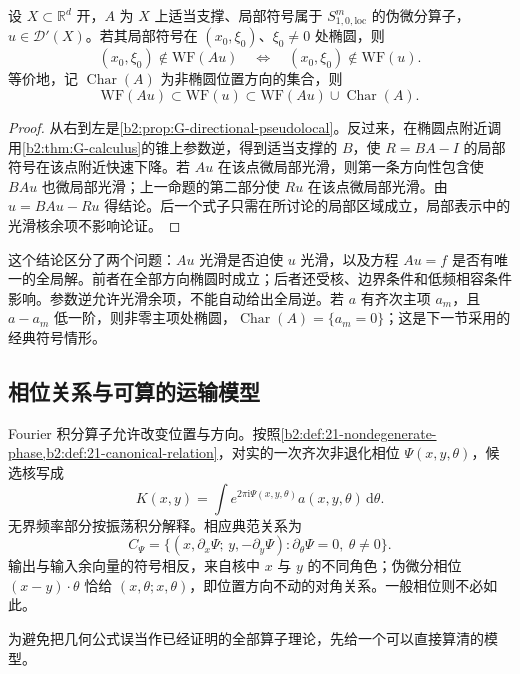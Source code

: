 \begin{theorem}[椭圆方向的正则性]\label{b2:thm:G-microlocal-elliptic}
设 \(X\subset\mathbb R^d\) 开，\(A\) 为 \(X\) 上适当支撑、局部符号属于 \(S^m_{1,0,\mathrm{loc}}\) 的伪微分算子，\(u\in\mathcal D'(X)\)。若其局部符号在 \((x_0,\xi_0)\)、\(\xi_0\ne0\) 处椭圆，则
\[
 (x_0,\xi_0)\notin\mathrm{WF}(Au)
 \quad\Longleftrightarrow\quad
 (x_0,\xi_0)\notin\mathrm{WF}(u).
\]
等价地，记 \(\operatorname{Char}(A)\) 为非椭圆位置方向的集合，则
\[
 \mathrm{WF}(Au)\subset\mathrm{WF}(u)
 \subset\mathrm{WF}(Au)\cup\operatorname{Char}(A).
\]
\end{theorem}
\begin{proof}
从右到左是\cref{b2:prop:G-directional-pseudolocal}。反过来，在椭圆点附近调用\cref{b2:thm:G-calculus}的锥上参数逆，得到适当支撑的 \(B\)，使 \(R=BA-I\) 的局部符号在该点附近快速下降。若 \(Au\) 在该点微局部光滑，则第一条方向性包含使 \(BAu\) 也微局部光滑；上一命题的第二部分使 \(Ru\) 在该点微局部光滑。由 \(u=BAu-Ru\) 得结论。后一个式子只需在所讨论的局部区域成立，局部表示中的光滑核余项不影响论证。
\end{proof}

这个结论区分了两个问题：\(Au\) 光滑是否迫使 \(u\) 光滑，以及方程 \(Au=f\) 是否有唯一的全局解。前者在全部方向椭圆时成立；后者还受核、边界条件和低频相容条件影响。参数逆允许光滑余项，不能自动给出全局逆。若 \(a\) 有齐次主项 \(a_m\)，且 \(a-a_m\) 低一阶，则非零主项处椭圆，\(\operatorname{Char}(A)=\{a_m=0\}\)；这是下一节采用的经典符号情形。

\subsection{相位关系与可算的运输模型}
\label{b2:subsec:G0502}

Fourier 积分算子允许改变位置与方向。按照\cref{b2:def:21-nondegenerate-phase,b2:def:21-canonical-relation}，对实的一次齐次非退化相位 \(\Psi(x,y,\theta)\)，候选核写成
\[
 K(x,y)=\int e^{2\pi\mathrm i\Psi(x,y,\theta)}
                a(x,y,\theta)\,\mathrm d\theta.
\]
无界频率部分按振荡积分解释。相应典范关系为
\[
 C_\Psi=\bigl\{(x,\partial_x\Psi;\,y,-\partial_y\Psi):
       \partial_\theta\Psi=0,\ \theta\ne0\bigr\}.
\]
输出与输入余向量的符号相反，来自核中 \(x\) 与 \(y\) 的不同角色；伪微分相位 \((x-y)\cdot\theta\) 恰给 \((x,\theta;x,\theta)\)，即位置方向不动的对角关系。一般相位则不必如此。

为避免把几何公式误当作已经证明的全部算子理论，先给一个可以直接算清的模型。

